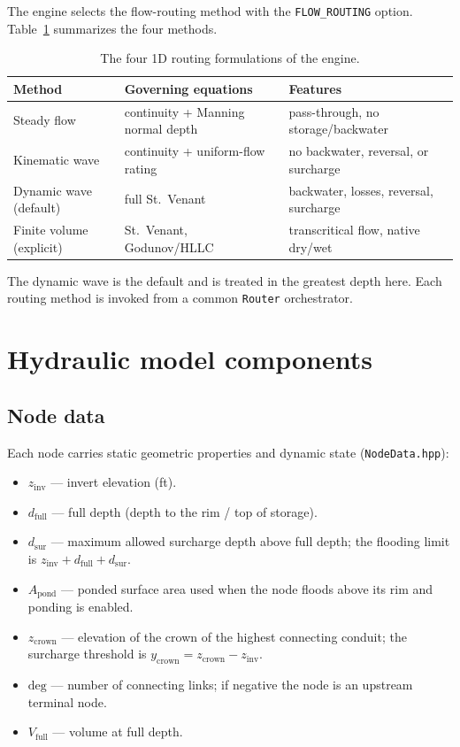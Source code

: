 \documentclass[11pt,a4paper]{article}
\begin{document}
The engine selects the flow-routing method with the \texttt{FLOW\_ROUTING}
option. Table~\ref{tab:routing} summarizes the four methods.

\begin{table}[H]
\centering
\begin{tabular}{@{}l p{4.6cm} p{5.4cm}@{}}
\toprule
\textbf{Method} & \textbf{Governing equations} & \textbf{Features} \\
\midrule
Steady flow & continuity + Manning normal depth & pass-through, no storage/backwater \\
Kinematic wave & continuity + uniform-flow rating & no backwater, reversal, or surcharge \\
Dynamic wave (default) & full St.\ Venant & backwater, losses, reversal, surcharge \\
Finite volume (explicit) & St.\ Venant, Godunov/HLLC & transcritical flow, native dry/wet \\
\bottomrule
\end{tabular}
\caption{The four 1D routing formulations of the engine.}
\label{tab:routing}
\end{table}

The dynamic wave is the default and is treated in the greatest depth here. Each
routing method is invoked from a common \texttt{Router} orchestrator.

\section{Hydraulic model components}

\subsection{Node data}

Each node carries static geometric properties and dynamic state
(\texttt{NodeData.hpp}):
\begin{itemize}[nosep]
  \item $z_{\mathrm{inv}}$ --- invert elevation (ft).
  \item $d_{\mathrm{full}}$ --- full depth (depth to the rim / top of storage).
  \item $d_{\mathrm{sur}}$ --- maximum allowed surcharge depth above full
        depth; the flooding limit is $z_{\mathrm{inv}} + d_{\mathrm{full}} +
        d_{\mathrm{sur}}$.
  \item $A_{\mathrm{pond}}$ --- ponded surface area used when the node floods
        above its rim and ponding is enabled.
  \item $z_{\mathrm{crown}}$ --- elevation of the crown of the highest
        connecting conduit; the surcharge threshold is $y_{\mathrm{crown}} =
        z_{\mathrm{crown}} - z_{\mathrm{inv}}$.
  \item $\mathrm{deg}$ --- number of connecting links; if negative the node is
        an upstream terminal node.
  \item $V_{\mathrm{full}}$ --- volume at full depth.
\end{itemize}
\end{document}
